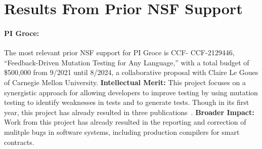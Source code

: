 \section{Results From Prior NSF Support}

\paragraph{PI Groce:}
The most relevant prior NSF support for PI Groce is CCF-
CCF-2129446, ``Feedback-Driven Mutation Testing for Any Language,'' with a total budget of \$500,000 from 9/2021 until 8/2024,
a collaborative proposal with Claire Le Goues of Carnegie Mellon
University. {\bf Intellectual Merit:} This project
focuses on a synergistic approach for allowing developers
to improve testing by using mutation testing to identify
weaknesses in tests and to generate tests.  Though in its first
year,  this project has already resulted in three
publications~\cite{cc2022,seip2022,fuzzing22}. {\bf
  Broader
  Impact:}  Work from this project has already
resulted in the reporting and correction of mulitple bugs in software
systems, including production compilers for smart contracts.

